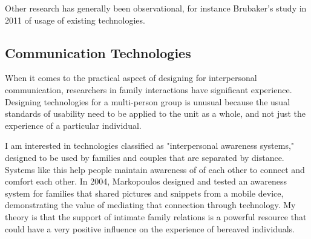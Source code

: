   Other research has generally been observational, for instance Brubaker's study
  in 2011 of usage of existing technologies. \cite{brubaker11}

  \subsection{Communication Technologies}
  When it comes to the practical aspect of designing for interpersonal
  communication, researchers in family interactions have significant experience.
  Designing technologies for a multi-person group is unusual because the usual
  standards of usability need to be applied to the unit as a whole, and not just
  the experience of a particular individual. \cite{neustaedter12}

  I am interested in technologies classified as "interpersonal awareness systems,"
  designed to be used by families and couples that are separated by distance.
  Systems like this help people maintain awareness of  of each other to connect
  and comfort each other. \cite{neustaedter06}
  In 2004, Markopoulos designed and tested an
  awareness system for families that shared pictures and snippets from a mobile
  device, demonstrating the value of mediating that connection through technology.
  \cite{markopoulos04}
  My theory is that the support of intimate family relations is a powerful
  resource that could
  have a very positive influence on the experience of bereaved individuals.

